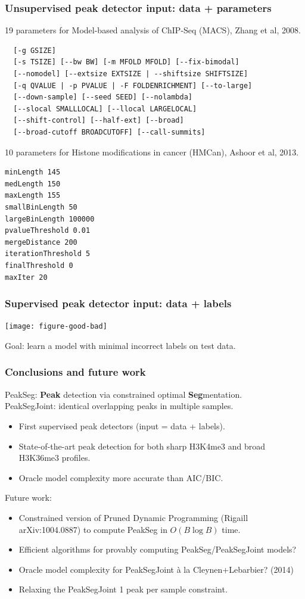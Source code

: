 \documentclass{beamer}
\begin{document}
\begin{frame}[fragile]
  \frametitle{Unsupervised peak detector input: data + parameters}
\scriptsize
19 parameters for Model-based analysis of ChIP-Seq (MACS), Zhang et al, 2008.
\begin{verbatim}
  [-g GSIZE]
  [-s TSIZE] [--bw BW] [-m MFOLD MFOLD] [--fix-bimodal]
  [--nomodel] [--extsize EXTSIZE | --shiftsize SHIFTSIZE]
  [-q QVALUE | -p PVALUE | -F FOLDENRICHMENT] [--to-large]
  [--down-sample] [--seed SEED] [--nolambda]
  [--slocal SMALLLOCAL] [--llocal LARGELOCAL]
  [--shift-control] [--half-ext] [--broad]
  [--broad-cutoff BROADCUTOFF] [--call-summits]
\end{verbatim}
10 parameters for Histone modifications in cancer (HMCan),
Ashoor et al, 2013.
\begin{verbatim}
minLength 145
medLength 150
maxLength 155
smallBinLength 50
largeBinLength 100000
pvalueThreshold 0.01
mergeDistance 200
iterationThreshold 5
finalThreshold 0
maxIter 20
\end{verbatim}
\end{frame}

\begin{frame}
  \frametitle{Supervised peak detector input: data + labels}

  \texttt{[image: figure-good-bad]}

  Goal: learn a model with minimal incorrect labels on test data.

\end{frame}

\begin{frame}
  \frametitle{Conclusions and future work}
  PeakSeg: \textbf{Peak} detection via constrained optimal
  \textbf{Seg}mentation.\\
  PeakSegJoint: identical overlapping peaks in multiple samples.
  \begin{itemize}
  \item First supervised peak detectors (input = data + labels).
  \item State-of-the-art peak detection for both sharp H3K4me3 and
    broad H3K36me3 profiles.
  \item Oracle model complexity more accurate than AIC/BIC.
  \end{itemize}
  Future work:
  \begin{itemize}
  \item Constrained version of Pruned Dynamic Programming (Rigaill
    arXiv:1004.0887) to compute PeakSeg in $O(B\log B)$ time.
  \item Efficient algorithms for provably computing
    PeakSeg/PeakSegJoint models?
  \item Oracle model complexity for PeakSegJoint \`a la
    Cleynen+Lebarbier?  (2014)
  \item Relaxing the PeakSegJoint 1 peak per sample constraint.
  \end{itemize}
\end{frame}
\end{document}
